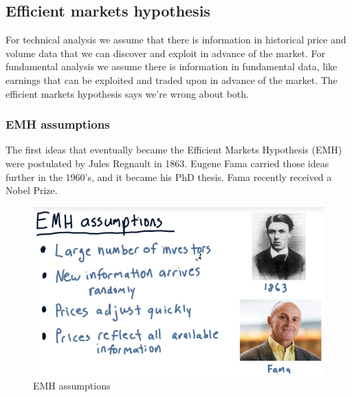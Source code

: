 \documentclass[12pt]{article}
\begin{document}
\subsection{Efficient markets hypothesis}

For technical analysis we assume that there is information in historical price and volume data that we can discover and exploit in advance of the market. For fundamental analysis we assume there is information in fundamental data, like earnings that can be exploited and traded upon in advance of the market. The efficient markets hypothesis says we're wrong about both. 

\subsubsection{EMH assumptions}

The first ideas that eventually became the Efficient Markets Hypothesis (EMH) were postulated by Jules Regnault in 1863. Eugene Fama carried those ideas further in the 1960's, and it became his PhD thesis. Fama recently received a Nobel Prize. 

\begin{figure}[!ht]
\centering
\includegraphics[scale=0.45]{fig/fig55}
\caption{EMH assumptions}
\end{figure}
\end{document}

